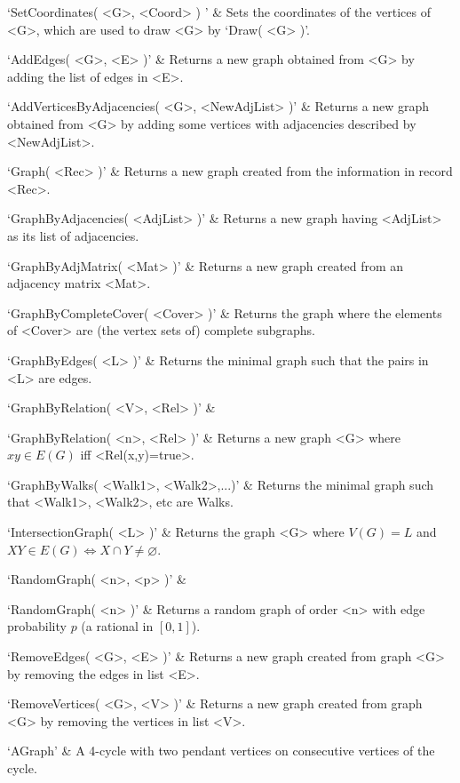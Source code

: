 `SetCoordinates( <G>, <Coord> ) ' &
Sets  the  coordinates  of the vertices of <G>, which are used to draw <G> by `Draw( <G> )'.
\enditems


\beginitems
`AddEdges( <G>, <E> )' & 
Returns a new graph obtained from <G> by adding the list of edges in <E>.

`AddVerticesByAdjacencies( <G>, <NewAdjList> )' & 
Returns a new graph obtained from <G> by adding some vertices with adjacencies described by <NewAdjList>.

`Graph( <Rec> )' & 
Returns  a  new  graph  created  from  the  information in record  <Rec>.

`GraphByAdjacencies( <AdjList> )' & 
Returns  a  new  graph  having  <AdjList>  as its list of adjacencies.

`GraphByAdjMatrix( <Mat> )' & 
Returns  a  new  graph  created from an adjacency matrix <Mat>.

`GraphByCompleteCover( <Cover> )' & 
Returns the graph where the elements of <Cover> are (the vertex sets of) complete subgraphs.

`GraphByEdges( <L> )' & 
Returns the minimal graph such that the pairs in <L> are edges.

`GraphByRelation( <V>, <Rel> )' & 

`GraphByRelation( <n>, <Rel> )' & 
Returns  a  new  graph  <G> where $xy \in E(G)$ iff <Rel(x,y)=true>.

`GraphByWalks( <Walk1>, <Walk2>,...)' & 
Returns the minimal graph such that <Walk1>, <Walk2>, etc are Walks.

`IntersectionGraph( <L> )' & 
Returns the graph <G> where $V(G)=L$ and $XY\in E(G) \iff X\cap Y \neq \varnothing$.

`RandomGraph( <n>, <p> )' & 

`RandomGraph( <n> )' & 
Returns a random graph of order <n> with edge probability $p$ (a rational in $[0,1]$).

`RemoveEdges( <G>, <E> )' & 
Returns  a  new graph created from graph <G> by removing the edges in list <E>.

`RemoveVertices( <G>, <V> )' & 
Returns  a  new  graph  created from graph <G> by removing the vertices in list <V>.
\enditems


\beginitems
`AGraph' & 
A 4-cycle with two pendant vertices on consecutive vertices of the cycle.

